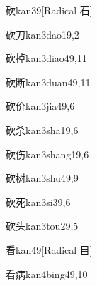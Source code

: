\begin{verbete}{砍}{kan3}{9}[Radical 石]
\end{verbete}

\begin{verbete}{砍刀}{kan3dao1}{9,2}
\end{verbete}

\begin{verbete}{砍掉}{kan3diao4}{9,11}
\end{verbete}

\begin{verbete}{砍断}{kan3duan4}{9,11}
\end{verbete}

\begin{verbete}{砍价}{kan3jia4}{9,6}
\end{verbete}

\begin{verbete}{砍杀}{kan3sha1}{9,6}
\end{verbete}

\begin{verbete}{砍伤}{kan3shang1}{9,6}
\end{verbete}

\begin{verbete}{砍树}{kan3shu4}{9,9}
\end{verbete}

\begin{verbete}{砍死}{kan3si3}{9,6}
\end{verbete}

\begin{verbete}{砍头}{kan3tou2}{9,5}
\end{verbete}

\begin{verbete}{看}{kan4}{9}[Radical 目]
\end{verbete}

\begin{verbete}{看病}{kan4bing4}{9,10}
\end{verbete}

